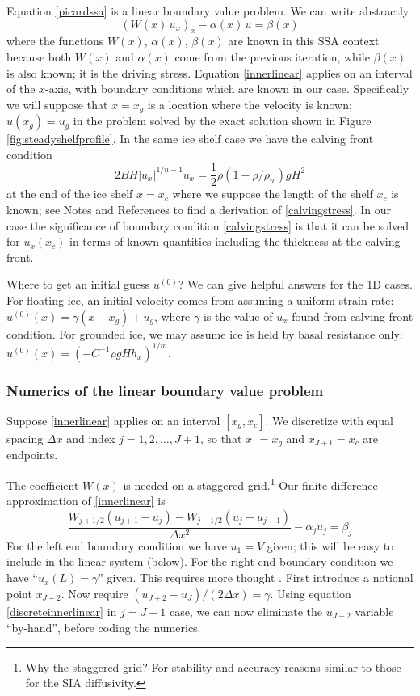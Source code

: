 \documentclass[titlepage,letterpaper,final,12pt]{scrartcl}
\begin{document}
Equation \eqref{picardssa} is a linear boundary value problem.  We can write abstractly
\begin{equation}
  \left(W(x)\, u_x\right)_x - \alpha(x)\, u = \beta(x)  \label{innerlinear}
\end{equation}
where the functions $W(x)$, $\alpha(x)$, $\beta(x)$ are known in this SSA context because both $W(x)$ and $\alpha(x)$ come from the previous iteration, while $\beta(x)$ is also known; it is the driving stress.  Equation \eqref{innerlinear} applies on an interval of the $x$-axis, with boundary conditions which are known in our case.  Specifically we will suppose that $x=x_g$ is a location where the velocity is known; $u(x_g)=u_g$ in the problem solved by the exact solution shown in Figure \ref{fig:steadyshelfprofile}.  In the same ice shelf case we have the calving front condition
\begin{equation}
  2 B H |u_x|^{1/n - 1} u_x = \frac{1}{2}\rho (1-\rho/\rho_w) g H^2  \label{calvingstress}
\end{equation}
at the end of the ice shelf $x=x_c$ where we suppose the length of the shelf $x_c$ is known; see Notes and References to find a derivation of \eqref{calvingstress}.  In our case the significance of boundary condition \eqref{calvingstress} is that it can be solved for $u_x(x_c)$ in terms of known quantities including the thickness at the calving front.

Where to get an initial guess $u^{(0)}$?  We can give helpful answers for the 1D cases.  For floating ice, an initial velocity comes from assuming a uniform strain rate: $u^{(0)}(x) = \gamma (x-x_g) + u_g$, where $\gamma$ is the value of $u_x$ found from calving front condition.  For grounded ice, we may assume ice is held by basal resistance only: $u^{(0)}(x) = \left(-C^{-1} \rho g H h_x\right)^{1/m}$.

\subsubsection*{Numerics of the linear boundary value problem}  Suppose \eqref{innerlinear} applies on an interval $[x_g,x_c]$.  We discretize with equal spacing $\Delta x$ and index $j=1,2,\dots,J+1$, so that $x_1 = x_g$ and $x_{J+1} = x_c$ are endpoints.

The coefficient $W(x)$ is needed on a staggered grid.\footnote{Why the staggered grid?  For stability and accuracy reasons similar to those for the SIA diffusivity.}  Our finite difference approximation of \eqref{innerlinear} is
\begin{equation}
  \frac{W_{j+1/2} (u_{j+1} - u_j) - W_{j-1/2} (u_{j} - u_{j-1})}{\Delta x^2} - \alpha_j u_j = \beta_j  \label{discreteinnerlinear}
\end{equation}
For the left end boundary condition we have $u_1 = V$ given; this will be easy to include in the linear system (below).  For the right end boundary condition we have ``$u_x(L)=\gamma$'' given.  This requires more thought \cite{MortonMayers}.  First introduce a notional point $x_{J+2}$.  Now require $(u_{J+2} - u_J)/(2 \Delta x) = \gamma$.  Using equation \eqref{discreteinnerlinear} in $j=J+1$ case, we can now eliminate the $u_{J+2}$ variable ``by-hand'', before coding the numerics.
\end{document}
